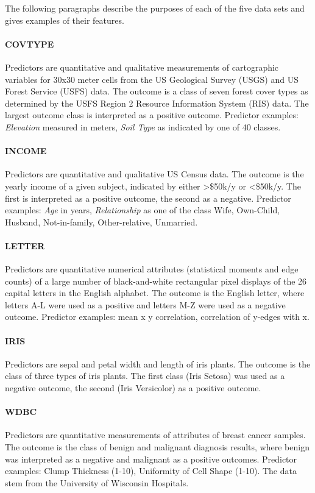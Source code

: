 \documentclass[twoside,11pt]{article}
\begin{document}
			The following paragraphs describe the purposes of each of the five data sets and gives examples of their features.
			
			\paragraph{COVTYPE}
			Predictors are quantitative and qualitative measurements of cartographic variables for 30x30 meter cells from the US Geological Survey (USGS) and US Forest Service (USFS) data. The outcome is a class of seven forest cover types as determined by the USFS Region 2 Resource Information System (RIS) data. The largest outcome class is interpreted as a positive outcome. Predictor examples: \textit{Elevation} measured in meters, \textit{Soil Type} as indicated by one of 40 classes.
			
			\paragraph{INCOME}
			Predictors are quantitative and qualitative US Census data. The outcome is the yearly income of a given subject, indicated by either >\$50k/y or <\$50k/y. The first is interpreted as a positive outcome, the second as a negative. Predictor examples: \textit{Age} in years, \textit{Relationship} as one of the class Wife, Own-Child, Husband, Not-in-family, Other-relative, Unmarried.
			
			\paragraph{LETTER}
			Predictors are quantitative numerical attributes (statistical moments and edge counts) of a large number of black-and-white rectangular pixel displays of the 26 capital letters in the English alphabet. The outcome is the English letter, where letters A-L were used as a positive and letters M-Z were used as a negative outcome. Predictor examples: mean x y correlation, correlation of y-edges with x.
			
			\paragraph{IRIS}
			Predictors are sepal and petal width and length of iris plants. The outcome is the class of three types of iris plants. The first class (Iris Setosa) was used as a negative outcome, the second (Iris Versicolor) as a positive outcome.
			
			\paragraph{WDBC}
			Predictors are quantitative measurements of attributes of breast cancer samples. The outcome is the class of benign and malignant diagnosis results, where benign was interpreted as a negative and malignant as a positive outcomes. Predictor examples: Clump Thickness (1-10), Uniformity of Cell Shape (1-10). The data stem from the University of Wisconsin Hospitals.
			
\end{document}
